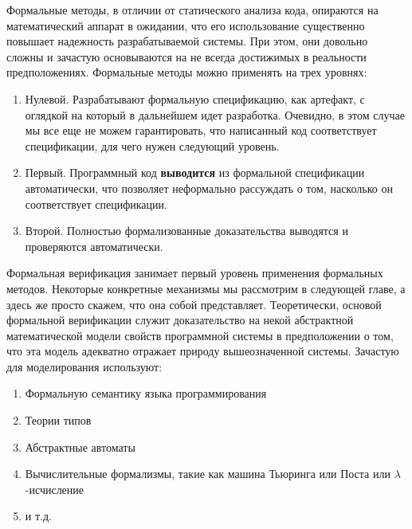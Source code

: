 Формальные методы, в отличии от статического анализа кода, опираются на математический аппарат в ожидании, что его использование существенно повышает надежность разрабатываемой системы. При этом, они довольно сложны и зачастую основываются на не всегда достижимых в реальности предположениях. Формальные методы можно применять на трех уровнях:

\begin{enumerate}
  \item Нулевой. Разрабатывают формальную спецификацию, как артефакт, с оглядкой на который в дальнейшем идет разработка. Очевидно, в этом случае мы все еще не можем гарантировать, что написанный код соответствует спецификации, для чего нужен следующий уровень.
  \item Первый. Программный код \textbf{выводится} из формальной спецификации автоматически, что позволяет неформально рассуждать о том, насколько он соответствует спецификации.
  \item Второй. Полностью формализованные доказательства выводятся и проверяются автоматически.
\end{enumerate}

Формальная верификация занимает первый уровень применения формальных методов. Некоторые конкретные механизмы мы рассмотрим в следующей главе, а здесь же просто скажем, что она собой представляет. Теоретически, основой формальной верификации служит доказательство на некой абстрактной математической модели свойств программной системы в предположении о том, что эта модель адекватно отражает природу вышеозначенной системы. Зачастую для моделирования используют:

\begin{enumerate}
  \item Формальную семантику языка программирования
  \item Теории типов
  \item Абстрактные автоматы
  \item Вычислительные формализмы, такие как машина Тьюринга или Поста или $\lambda$-исчисление
  \item и т.д.
\end{enumerate}
